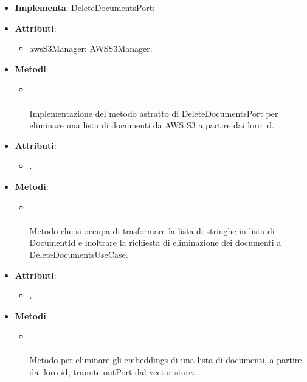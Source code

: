 \documentclass[10pt, a4paper]{article}
\begin{document}
\label{DeleteDocumentsAWSS3Dettaglio}
\begin{itemize}
    \item \textbf{Implementa}: DeleteDocumentsPort;
    \item \textbf{Attributi}:
    \begin{itemize}
        \item awsS3Manager: AWSS3Manager.
    \end{itemize}
    \item \textbf{Metodi}:
    \begin{itemize}
        \item {}\\ \\
        Implementazione del metodo astratto di DeleteDocumentsPort per eliminare una lista di documenti da AWS S3 a partire dai loro id.
    \end{itemize}
\end{itemize}


\label{DeleteDocumentsControllerDettaglio}
\begin{itemize}
    \item \textbf{Attributi}:
    \begin{itemize}
        \item {}.
    \end{itemize}
    \item \textbf{Metodi}:
    \begin{itemize}
        \item {}\\ \\
        Metodo che si occupa di trasformare la lista di stringhe in lista di DocumentId e inoltrare la richiesta di eliminazione dei documenti a DeleteDocumentsUseCase.
    \end{itemize}
\end{itemize}

\label{DeleteDocumentsEmbeddingsDettaglio}
\begin{itemize}
    \item \textbf{Attributi}:
    \begin{itemize}
        \item {}. 
    \end{itemize}
    \item \textbf{Metodi}:
    \begin{itemize}
        \item {}\\ \\
        Metodo per eliminare gli embeddings di una lista di documenti, a partire dai loro id, tramite outPort dal vector store.
    \end{itemize}
\end{itemize}
\end{document}

